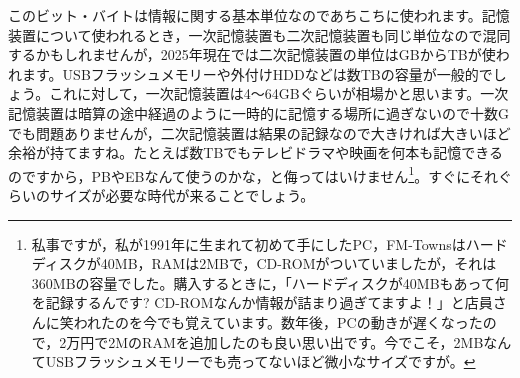 \documentclass{ltjsbook}
\begin{document}
このビット・バイトは情報に関する基本単位なのであちこちに使われます。記憶装置について使われるとき，一次記憶装置も二次記憶装置も同じ単位なので混同するかもしれませんが，2025年現在では二次記憶装置の単位はGBからTBが使われます。USBフラッシュメモリーや外付けHDDなどは数TBの容量が一般的でしょう。これに対して，一次記憶装置は4〜64GBぐらいが相場かと思います。一次記憶装置は暗算の途中経過のように一時的に記憶する場所に過ぎないので十数Gでも問題ありませんが，二次記憶装置は結果の記録なので大きければ大きいほど余裕が持てますね。たとえば数TBでもテレビドラマや映画を何本も記憶できるのですから，PBやEBなんて使うのかな，と侮ってはいけません\footnote{私事ですが，私が1991年に生まれて初めて手にしたPC，FM-Townsはハードディスクが40MB，RAMは2MBで，CD-ROMがついていましたが，それは360MBの容量でした。購入するときに，「ハードディスクが40MBもあって何を記録するんです? CD-ROMなんか情報が詰まり過ぎてますよ！」と店員さんに笑われたのを今でも覚えています。数年後，PCの動きが遅くなったので，2万円で2MのRAMを追加したのも良い思い出です。今でこそ，2MBなんてUSBフラッシュメモリーでも売ってないほど微小なサイズですが。}。すぐにそれぐらいのサイズが必要な時代が来ることでしょう。
\end{document}

